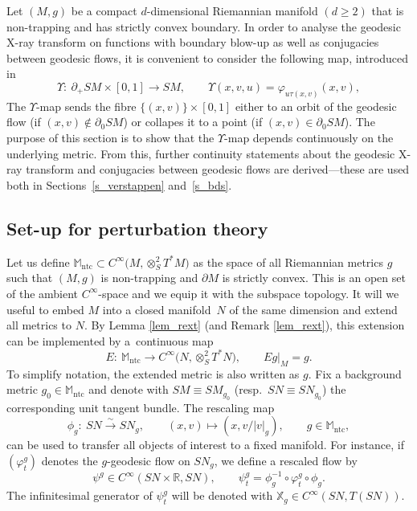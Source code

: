 \documentclass[pdftex]{sigma}
\numberwithin{equation}{section}
\theoremstyle{definition}
\newcommand{\R}{\mathbb{R}} %
\newcommand{\M}{\mathbb{M}}
\newcommand{\1}{{\bf 1}}
\newcommand{\ntc}{\mathrm{ntc}}
\begin{document}
Let $(M,g)$ be a compact $d$-dimensional Riemannian manifold $(d\ge 2)$ that is non-trapping and has strictly convex boundary. In order to analyse the geodesic X-ray transform on functions with boundary blow-up as well as conjugacies between geodesic flows, it is convenient to consider the following map, introduced in \cite{MNP20}
\[
	\Upsilon\colon\ \partial_+SM\times [0,1]\rightarrow SM,\qquad \Upsilon(x,v,u)=\varphi_{u\tau(x,v)}(x,v),
\]
The $\Upsilon$-map sends the fibre $\{(x,v)\}\times [0,1]$ either to an orbit of the geodesic flow (if $(x,v)\notin \partial_0SM$) or collapes it to a point (if $(x,v) \in \partial_0SM$).
The purpose of this section is to show that the $\Upsilon$-map depends continuously on the underlying metric. From this, further continuity statements about the geodesic X-ray transform and conjugacies between geodesic flows are derived---these are used both in Sections~\ref{s_verstappen} and~\ref{s_bds}.


\subsection{Set-up for perturbation theory}
Let us define
$\mathbb M_\ntc \subset C^\infty\bigl(M,\otimes_S^2T^*M\bigr)
$ as the space of all Riemannian metrics $g$ such that $(M,g)$ is non-trapping and $\partial M$ is strictly convex. This is an open set of the ambient $C^\infty$-space and we equip it with the subspace topology. It will we useful to embed $M$ into a closed manifold~$N$ of the same dimension and extend all metrics to $N$. By Lemma \ref{lem_rext} (and Remark \ref{lem_rext}), this extension can be implemented by a~continuous map
\begin{equation}\label{extensionE}
 E\colon\ \mathbb M_\ntc \rightarrow C^\infty\bigl(N,\otimes^2_S T^*N\bigr), \qquad Eg\vert_{M}=g.
\end{equation}
To simplify notation, the extended metric is also written as $g$.
Fix a background metric $g_0\in \M_\ntc$ and denote with $SM\equiv SM_{g_0}$ (resp.~$SN\equiv SN_{g_0}$) the corresponding unit tangent bundle.
The rescaling map
\[
	\phi_g\colon\ SN\xrightarrow{\sim} SN_g,\qquad (x,v)\mapsto (x,v/|v|_g),\qquad g\in \M_\ntc,
\]
can be used to transfer all objects of interest to a fixed manifold.
For instance, if $(\varphi^g_t)$ denotes the $g$-geodesic flow on $SN_g$, we define a rescaled flow by
\begin{equation*}
\psi^g\in C^\infty(SN\times \R,SN),\qquad \psi_t^g=\phi_g^{-1}\circ \varphi_t^g\circ \phi_g.
\end{equation*}
The infinitesimal generator of $\psi^g_t$ will be denoted with $\mathbb X_g \in C^\infty(SN,T(SN))$.
\end{document}
